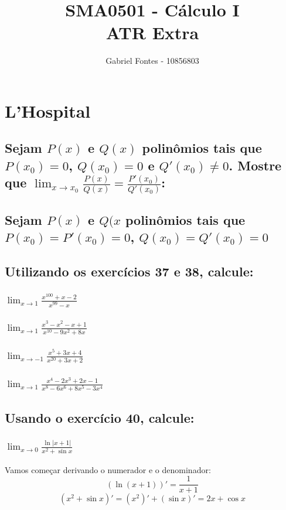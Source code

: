 \documentclass[12pt]{article}
\title{SMA0501 - Cálculo I \\ ATR Extra}%
\author{Gabriel Fontes - 10856803}%
\theoremstyle{definition}
\begin{document}
\maketitle

\section{L'Hospital}
\subsection{Sejam \(P(x)\) e \(Q(x)\) polinômios tais que \(P(x_0) = 0\), \(Q(x_0) = 0\) e \(Q'(x_0) \ne 0\). Mostre que \(\lim_{x\rightarrow x_0} \frac{P(x)}{Q(x)} = \frac{P'(x_0)}{Q'(x_0)}\):}

\subsection{Sejam \(P(x)\) e \(Q(x\) polinômios tais que \(P(x_0) =P'(x_0) = 0\), \(Q(x_0) = Q'(x_0)=0\)}

\subsection{Utilizando os exercícios 37 e 38, calcule:}
\subsubsection{\(\lim_{x\rightarrow 1}\frac{x^{100}+x-2}{x^{99}-x}\)}
\subsubsection{\(\lim_{x\rightarrow 1}\frac{x^3-x^2-x+1}{x^{10}-9x^2+8x}\)}
\subsubsection{\(\lim_{x\rightarrow -1}\frac{x^5+3x+4}{x^{20}+3x+2}\)}
\subsubsection{\(\lim_{x\rightarrow 1}\frac{x^4-2x^3+2x-1}{x^8-6x^6+8x^5-3x^4}\)}

\subsection{Usando o exercício 40, calcule:}
\subsubsection{\(\lim_{x\rightarrow 0}\frac{\ln{|x+1|}}{x^2+\sin{x}}\)}
Vamos começar derivando o numerador e o denominador:
\[
    (\ln{(x+1)})' = \frac{1}{x+1}
\]
\[
    (x^2+\sin{x})' = (x^2)' + (\sin{x})' = 2x + \cos{x}
\]
\end{document}

